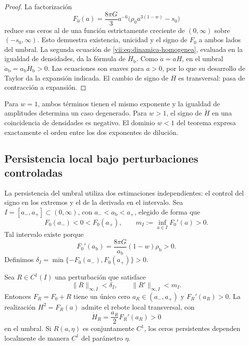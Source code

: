 \begin{proof}
La factorización
\[
 F_0(a)=\frac{8\pi G}{3}a^{-6}
             \bigl(\rho_0a^{3(1-w)}-s_0\bigr)
\]
reduce sus ceros al de una función estrictamente creciente de
\((0,\infty)\) sobre \((-s_0,\infty)\). Esto demuestra existencia,
unicidad y el signo de \(F_0\) a ambos lados del umbral.
La segunda ecuación de \eqref{vii:eq:dinamica-homogenea}, evaluada
en la igualdad de densidades, da la fórmula de \(\dot H_{\mathrm b}\).
Como \(\dot a=aH\), en el umbral
\(\ddot a_{\mathrm b}=a_{\mathrm b}\dot H_{\mathrm b}>0\).
Las ecuaciones son suaves para \(a>0\), por lo que su desarrollo de
Taylor da la expansión indicada. El cambio de signo de \(H\) es
transversal: pasa de contracción a expansión.
\end{proof}

Para \(w=1\), ambos términos tienen el mismo exponente y la igualdad de
amplitudes determina un caso degenerado. Para \(w>1\), el signo de
\(\dot H\) en una coincidencia de densidades es negativo.
El dominio \(w<1\) del teorema expresa exactamente el orden entre los
dos exponentes de dilución.

\subsection{Persistencia local bajo perturbaciones controladas}
\label{vii:sec:persistencia}

La persistencia del umbral utiliza dos estimaciones independientes:
el control del signo en los extremos y el de la derivada en el
intervalo. Sea \(I=[a_-,a_+]\subset(0,\infty)\), con
\(a_-<a_{\mathrm b}<a_+\), elegido de forma que
\[
 F_0(a_-)<0<F_0(a_+),\qquad
 m_I:=\inf_{a\in I}F_0'(a)>0.
\]
Tal intervalo existe porque
\[
 F_0'(a_{\mathrm b})
   =\frac{8\pi G}{a_{\mathrm b}}(1-w)\rho_{\mathrm b}>0.
\]
Definimos
\(\delta_I=\min\{-F_0(a_-),F_0(a_+)\}>0\).

\begingroup\fontsize{10}{11.7}\selectfont
\setlength{\parskip}{2pt}\setlength{\abovedisplayskip}{5pt}\setlength{\belowdisplayskip}{5pt}
\begin{theorem}
\label{vii:thm:persistencia}
Sea \(R\in C^1(I)\) una perturbación que satisface
\[
 \|R\|_{\infty,I}<\delta_I,\qquad
 \|R'\|_{\infty,I}<m_I.
\]
Entonces \(F_R=F_0+R\) tiene un único cero \(a_R\in(a_-,a_+)\) y
\(F_R'(a_R)>0\). La realización \(H^2=F_R(a)\) admite el rebote local
transversal, con
\[
 \dot H_R=\frac{a_R}{2}F_R'(a_R)>0
\]
en el umbral. Si \(R(a,\eta)\) es conjuntamente \(C^1\), los ceros
persistentes dependen localmente de manera \(C^1\) del parámetro \(\eta\).
\end{theorem}

